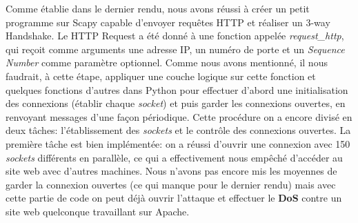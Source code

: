 \documentclass{article}
\begin{document}
Comme établie dans le dernier rendu, nous avons réussi à créer un petit programme sur Scapy capable d'envoyer
requêtes HTTP et réaliser un 3-way Handshake. Le HTTP Request a été donné à une fonction appelée \textit{request\_http},
qui reçoit comme arguments une adresse IP, un numéro de porte et un \textit{Sequence Number} comme paramètre optionnel.
Comme nous avons mentionné, il nous faudrait, à cette étape, appliquer une couche logique sur cette fonction
et quelques fonctions d'autres dans Python pour effectuer d'abord une initialisation des connexions (établir
chaque \textit{socket}) et puis garder les connexions ouvertes, en renvoyant messages d'une façon périodique.
Cette procédure on a encore divisé en deux tâches: l'établissement des \textit{sockets} et le contrôle
des connexions ouvertes. La première tâche est bien implémentée: on a réussi d'ouvrir une connexion avec 150 \textit{sockets}
différents en parallèle, ce qui a effectivement nous empêché d'accéder au site web avec d'autres machines.
Nous n'avons pas encore mis les moyennes de garder la connexion ouvertes (ce qui manque pour le dernier rendu)
mais avec cette partie de code on peut déjà ouvrir l'attaque et effectuer le \textbf{DoS} contre un
site web quelconque travaillant sur Apache.
\end{document}
